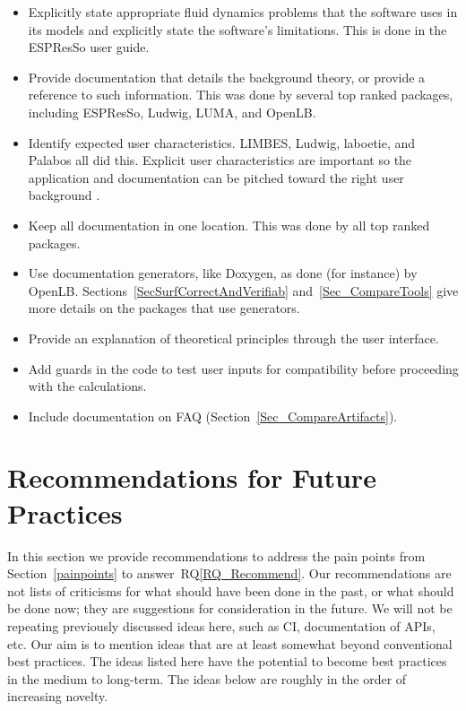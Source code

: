 \documentclass[final, 3p, times, authoryear]{elsarticle}
\newcommand{\rqref}[1]{RQ\ref{#1}}
\begin{document}
\begin{itemize}
	\item Explicitly state appropriate fluid dynamics problems that the software
	uses in its models and explicitly state the software's limitations. This is
	done in the ESPResSo user guide.
	\item Provide documentation that details the background theory, or provide a
	reference to such information. This was done by several top ranked packages,
	including ESPResSo, Ludwig, LUMA, and OpenLB.
	\item Identify expected user characteristics. LIMBES, Ludwig, laboetie, and
	Palabos all did this. Explicit user characteristics are important so the
	application and documentation can be pitched toward the right user
	background \citep{SmithEtAl2007}.
	\item Keep all documentation in one location. This was done by all top
	ranked packages.
	\item Use documentation generators, like Doxygen, as done (for instance) by
	OpenLB.  Sections~\ref{SecSurfCorrectAndVerifiab} and~\ref{Sec_CompareTools}
	give more details on the packages that use generators.
	\item Provide an explanation of theoretical principles through the user interface.
	\item Add guards in the code to test user inputs for compatibility before
	proceeding with the calculations.
	\item Include documentation on FAQ (Section~\ref{Sec_CompareArtifacts}).
\end{itemize}

\section{Recommendations for Future Practices} \label{Sec_Recommendations}

In this section we provide recommendations to address the pain points from
Section~\ref{painpoints} to answer~\rqref{RQ_Recommend}.  Our recommendations
are not lists of criticisms for what should have been done in the past, or what
should be done now; they are suggestions for consideration in the future. We
will not be repeating previously discussed ideas here, such as CI, documentation
of APIs, etc.  Our aim is to mention ideas that are at least somewhat beyond
conventional best practices. The ideas listed here have the potential to become
best practices in the medium to long-term. The ideas below are roughly in the
order of increasing novelty.
\end{document}
